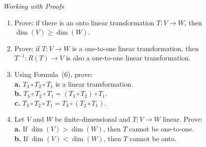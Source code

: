 \documentclass{article}
\begin{document}
\noindent\textit{Working with Proofs}

\begin{enumerate}
  \item[44.] Prove: if there is an onto linear transformation $T : V \to W$, then
        $\dim(V) \geq \dim(W)$.

  \item[45.] Prove: if $T : V \to W$ is a one-to-one linear transformation, then
        $T^{-1} : R(T) \to V$ is also a one-to-one linear transformation.

  \item[46.] Using Formula~(6), prove:\\
        \textbf{a.} $T_3\circ T_2\circ T_1$ is a linear transformation.\\
        \textbf{b.} $T_3\circ T_2\circ T_1 = (T_3\circ T_2)\circ T_1$.\\
        \textbf{c.} $T_3\circ T_2\circ T_1 = T_3\circ(T_2\circ T_1)$.

  \item[47.] Let $V$ and $W$ be finite-dimensional and $T : V \to W$ linear. Prove:\\
        \textbf{a.} If $\dim(V) > \dim(W)$, then $T$ cannot be one-to-one.\\
        \textbf{b.} If $\dim(V) < \dim(W)$, then $T$ cannot be onto.

\end{enumerate}
\end{document}
